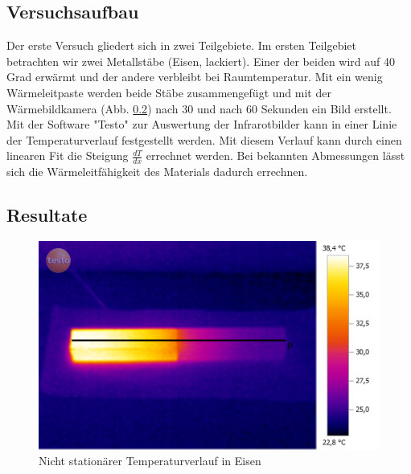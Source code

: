 \documentclass[12pt,a4paper]{article}
\begin{document}
\begin{multicols}{2}
\subsection{Versuchsaufbau}
Der erste Versuch gliedert sich in zwei Teilgebiete. Im ersten Teilgebiet betrachten wir zwei Metallstäbe (Eisen, lackiert). Einer der beiden wird auf 40 Grad erwärmt und der andere verbleibt bei Raumtemperatur. Mit ein wenig Wärmeleitpaste werden beide Stäbe zusammengefügt und mit der Wärmebildkamera (Abb. \ref{}) nach 30 und nach 60 Sekunden ein Bild erstellt.\\
Mit der Software "Testo" zur Auswertung der Infrarotbilder kann in einer Linie der Temperaturverlauf festgestellt werden.
Mit diesem Verlauf kann durch einen linearen Fit die Steigung $\frac{dT}{dx}$ errechnet werden. Bei bekannten Abmessungen lässt sich die Wärmeleitfähigkeit des Materials dadurch errechnen. 

\subsection{Resultate}

\begin{figure}[H]
	\centering
	\includegraphics[scale=0.12]{./BilderCorrect/Versuch_1_gradient_60.png}
	\caption{Nicht stationärer Temperaturverlauf in Eisen}
	\label{fig:nicht_stat_verlauf}
\end{figure}


\end{multicols}
\end{document}
